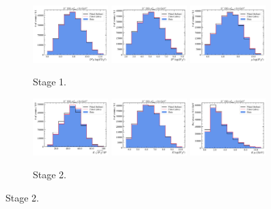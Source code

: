 \begin{figure}[htb]
    \begin{subfigure}{\textwidth}
        \centering
        \includegraphics[width=0.32\textwidth]{./figs-mc-correction/reweighting-final/plot_step1-Dst_iso-b_log_fd_chi2.pdf}
        \includegraphics[width=0.32\textwidth]{./figs-mc-correction/reweighting-final/plot_step1-Dst_iso-d0_log_ip_chi2.pdf}
        \includegraphics[width=0.32\textwidth]{./figs-mc-correction/reweighting-final/plot_step1-Dst_iso-mu_log_ip_chi2.pdf}
        \caption{Stage 1.}
    \end{subfigure}

    \begin{subfigure}{\textwidth}
        \centering
        \includegraphics[width=0.32\textwidth]{./figs-mc-correction/reweighting-final/plot_step2-Dst_iso-k_comp.pdf}
        \includegraphics[width=0.32\textwidth]{./figs-mc-correction/reweighting-final/plot_step2-Dst_iso-k_log_ip_chi2.pdf}
        \includegraphics[width=0.32\textwidth]{./figs-mc-correction/reweighting-final/plot_step2-Dst_iso-k_pt.pdf}
        \caption{Stage 2.}
    \end{subfigure}


\end{figure}
